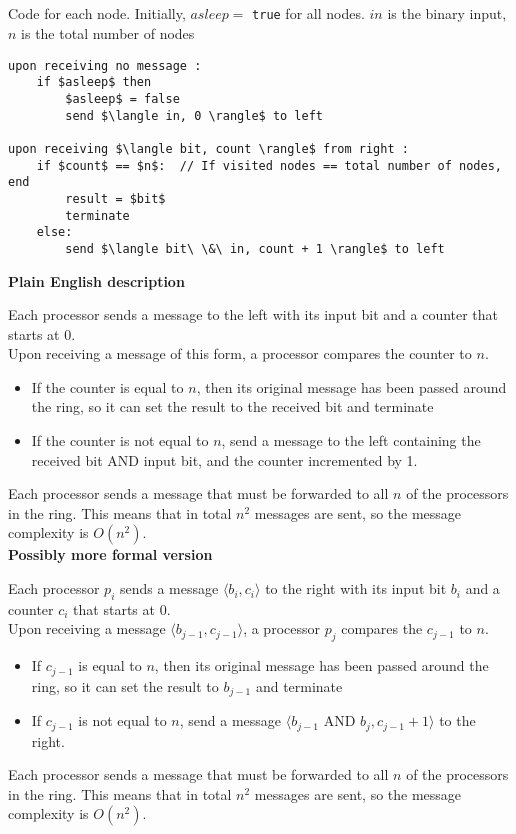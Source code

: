 \documentclass[11pt]{article}
\begin{document}
\subsection{}

Code for each node. Initially, $asleep =$ \texttt{true} for all nodes. $in$ is the binary input, $n$ is the total number of nodes

\begin{lstlisting}
upon receiving no message :
	if $asleep$ then
		$asleep$ = false
		send $\langle in, 0 \rangle$ to left

upon receiving $\langle bit, count \rangle$ from right :
	if $count$ == $n$:  // If visited nodes == total number of nodes, end
		result = $bit$
		terminate
	else:
		send $\langle bit\ \&\ in, count + 1 \rangle$ to left

\end{lstlisting}

\textbf{Plain English description}

Each processor sends a message to the left with its input bit and a counter that starts at 0.\\
Upon receiving a message of this form, a processor compares the counter to $n$.\\
\begin{itemize}
\item If the counter is equal to $n$, then its original message has been passed around the ring, so it can set the result to the received bit and terminate
\item If the counter is not equal to $n$, send a message to the left containing the received bit AND input bit, and the counter incremented by 1.
\end{itemize}
Each processor sends a message that must be forwarded to all $n$ of the processors in the ring. This means that in total $n^2$ messages are sent, so the message complexity is $O(n^2)$.\\

\textbf{Possibly more formal version}

Each processor $p_i$ sends a message $\langle b_i, c_i \rangle$ to the right with its input bit $b_i$ and a counter $c_i$ that starts at 0.\\
Upon receiving a message $\langle b_{j-1}, c_{j-1} \rangle$, a processor $p_j$ compares the $c_{j-1}$ to $n$.\\
\begin{itemize}
\item If $c_{j-1}$ is equal to $n$, then its original message has been passed around the ring, so it can set the result to $b_{j-1}$ and terminate
\item If $c_{j-1}$ is not equal to $n$, send a message $\langle b_{j-1} \text{ AND } b_j, c_{j-1} + 1 \rangle$ to the right.
\end{itemize}
Each processor sends a message that must be forwarded to all $n$ of the processors in the ring. This means that in total $n^2$ messages are sent, so the message complexity is $O(n^2)$.
\end{document}
